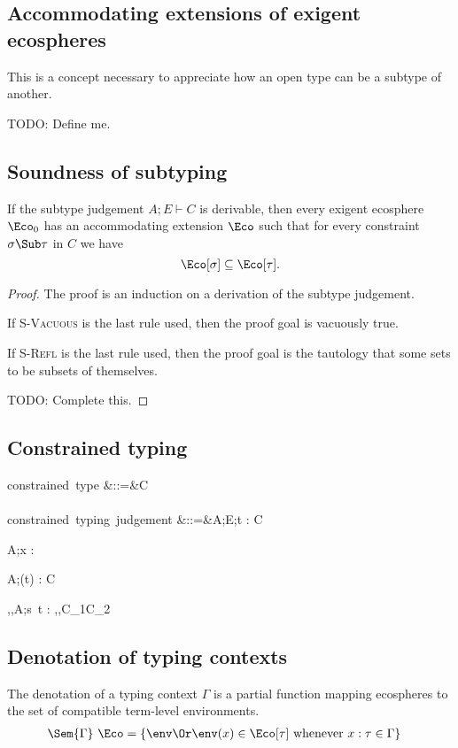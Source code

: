 \documentclass{amsart}
\theoremstyle{definition}
\begin{document}
\subsection{Accommodating extensions of exigent ecospheres}
This is a concept necessary to appreciate how an open type can be
a subtype of another.

TODO: Define me.

\subsection{Soundness of subtyping}
\label{subsound}
If the subtype judgement $A;E\vdash C$ is derivable, then every
exigent ecosphere $\Eco_0$ has an accommodating extension $\Eco$
such that for every constraint $\sigma\Sub\tau$ in $C$ we have
\[
\Eco[\sigma] \subseteq \Eco[\tau].
\]

\begin{proof}
The proof is an induction on a derivation of the subtype
judgement.

If \textsc{S-Vacuous} is the last rule used, then the proof goal
is vacuously true.

If \textsc{S-Refl} is the last rule used, then the proof goal is
the tautology that some sets to be subsets of themselves.

TODO: Complete this.
\end{proof}

\subsection{Constrained typing}
\begin{syntax}
\mbox{constrained type}
&::=&\tau \Given C
\\\\
\mbox{constrained typing judgement}
&::=&A;E;\Gamma \vdash t : \tau \Given C
\end{syntax}%
{A;\Gamma\vdash x : \tau \Given \emptyset}

{A;\Gamma\vdash (t) : \sigma\R\tau \Given C}

{\alpha,\beta,A;\Gamma\vdash s~t : \beta \Given
\sigma\Sub\alpha\R\beta,\tau\Sub\alpha,C_1\cup C_2}

\subsection{Denotation of typing contexts}
The denotation of a typing context $\Gamma$ is a partial function
mapping ecospheres to the set of compatible
term-level environments.
\begin{align*}
\Sem{\Gamma}~\Eco&=
\left\{\env \Or
\env(x)\in\Eco[\tau]\text{ whenever }x:\tau\in\Gamma
\right\}
\end{align*}
\end{document}
